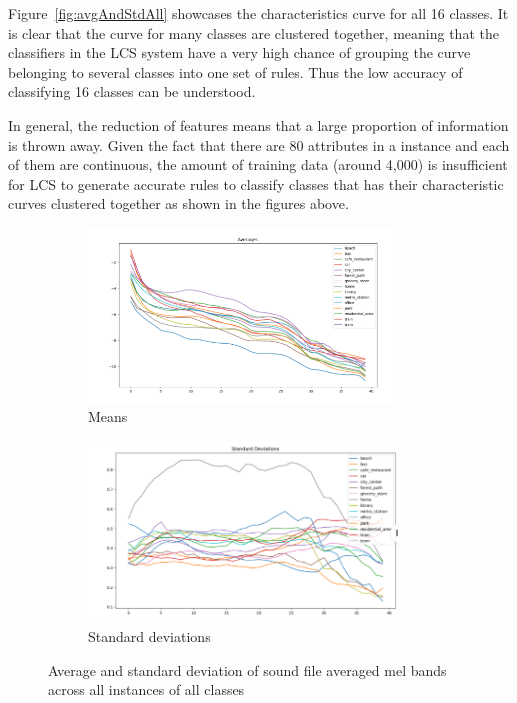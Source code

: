 \documentclass[11pt]{article}
\begin{document}
Figure~\ref{fig:avgAndStdAll} showcases the characteristics curve for all 16 classes. It is clear that the curve for many classes are clustered together, meaning that the classifiers in the LCS system have a very high chance of grouping the curve belonging to several classes into one set of rules. Thus the low accuracy of classifying 16 classes can be understood. 

In general, the reduction of features means that a large proportion of information is thrown away. Given the fact that there are 80 attributes in a instance and each of them are continuous, the amount of training data (around 4,000) is insufficient for LCS to generate accurate rules to classify classes that has their characteristic curves clustered together as shown in the figures above. 


\begin{figure}[!htbp]
	\centering
	\begin{subfigure}[t]{0.48\textwidth}
		\centering
		\includegraphics[width=0.9\textwidth]{yiyang_figures/avg_all_classes.png}
		\caption{Means}
	\end{subfigure}
	\begin{subfigure}[t]{0.48\textwidth}
		\centering
		\includegraphics[width=0.9\textwidth]{yiyang_figures/stds_all_classes.png}
		\caption{Standard deviations}
	\end{subfigure}
	\caption{Average and standard deviation of sound file averaged mel bands across all instances of all classes}
	\label{fig:avgAndStd4}
\end{figure}
\end{document}
